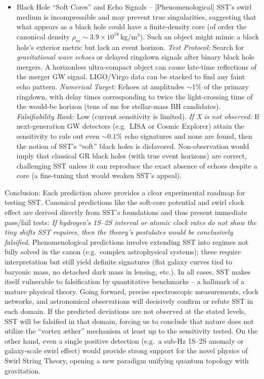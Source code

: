 \documentclass[11pt]{article}
\begin{document}
\begin{itemize}
\item
Black Hole ``Soft Cores'' and Echo Signals -- [Phenomenological] SST's swirl medium is incompressible and may prevent true singularities, suggesting that what appears as a black hole could have a finite-density core (of order the canonical density $\rho_m \sim 3.9\times10^{18}$\,kg/m$^3$). Such an object might mimic a black hole's exterior metric but lack an event horizon. \textit{Test Protocol:} Search for \textit{gravitational wave echoes} or delayed ringdown signals after binary black hole mergers. A horizonless ultra-compact object can cause late-time reflections of the merger GW signal. LIGO/Virgo data can be stacked to find any faint echo pattern. \textit{Numerical Target:} Echoes at amplitudes $\sim$1\% of the primary ringdown, with delay times corresponding to twice the light-crossing time of the would-be horizon (tens of ms for stellar-mass BH candidates). \textit{Falsifiability Rank:} Low (current sensitivity is limited). \textit{If X is not observed:} If next-generation GW detectors (e.g.\ LISA or Cosmic Explorer) attain the sensitivity to rule out even $\sim0.1\%$ echo signatures and none are found, then the notion of SST's ``soft'' black holes is disfavored. Non-observation would imply that classical GR black holes (with true event horizons) are correct, challenging SST unless it can reproduce the exact absence of echoes despite a core (a fine-tuning that would weaken SST's appeal).

\end{itemize}

Conclusion: Each prediction above provides a clear experimental roadmap for testing SST. Canonical predictions like the soft-core potential and swirl clock effect are derived directly from SST's foundations and thus present immediate pass/fail tests: \textit{If hydrogen's 1S--2S interval or atomic clock rates do not show the tiny shifts SST requires, then the theory's postulates would be conclusively falsified.} Phenomenological predictions involve extending SST into regimes not fully solved in the canon (e.g.\ complex astrophysical systems); these require interpretation but still yield definite signatures (flat galaxy curves tied to baryonic mass, no detached dark mass in lensing, etc.). In all cases, SST makes itself vulnerable to falsification by quantitative benchmarks -- a hallmark of a mature physical theory. Going forward, precise spectroscopic measurements, clock networks, and astronomical observations will decisively confirm or refute SST in each domain. If the predicted deviations are not observed at the stated levels, SST will be falsified in that domain, forcing us to conclude that nature does not utilize the ``vortex \ae ther'' mechanism at least up to the sensitivity tested. On the other hand, even a single positive detection (e.g.\ a sub-Hz 1S--2S anomaly or galaxy-scale swirl effect) would provide strong support for the novel physics of Swirl String Theory, opening a new paradigm unifying quantum topology with gravitation.
\end{document}
